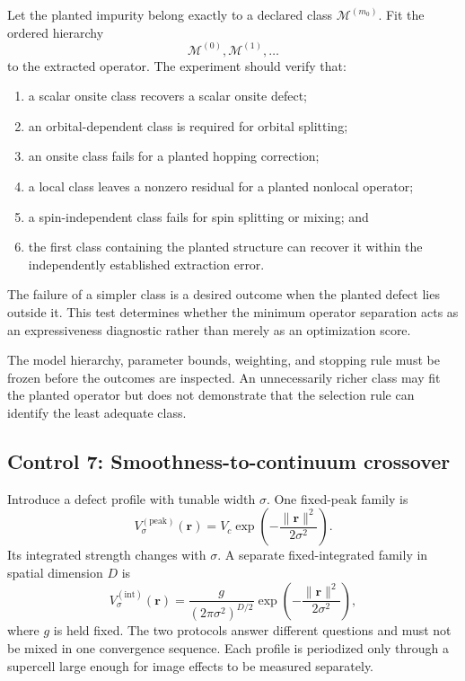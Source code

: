 Let the planted impurity belong exactly to a declared class
$\mathcal M^{(m_0)}$. Fit the ordered hierarchy
\begin{equation}
    \mathcal M^{(0)},
    \mathcal M^{(1)},
    \ldots
\end{equation}
to the extracted operator. The experiment should verify that:
\begin{enumerate}
    \item a scalar onsite class recovers a scalar onsite defect;
    \item an orbital-dependent class is required for orbital splitting;
    \item an onsite class fails for a planted hopping correction;
    \item a local class leaves a nonzero residual for a planted nonlocal
          operator;
    \item a spin-independent class fails for spin splitting or mixing; and
    \item the first class containing the planted structure can recover it
          within the independently established extraction error.
\end{enumerate}
The failure of a simpler class is a desired outcome when the planted defect lies
outside it. This test determines whether the minimum operator separation acts
as an expressiveness diagnostic rather than merely as an optimization score.

The model hierarchy, parameter bounds, weighting, and stopping rule must be
frozen before the outcomes are inspected. An unnecessarily richer class may
fit the planted operator but does not demonstrate that the selection rule can
identify the least adequate class.

\subsection*{Control 7: Smoothness-to-continuum crossover}

Introduce a defect profile with tunable width $\sigma$. One fixed-peak family
is
\begin{equation}
    V_{\sigma}^{(\mathrm{peak})}(\mathbf r)
    =
    V_c
    \exp\left(
        -\frac{\lVert\mathbf r\rVert^2}{2\sigma^2}
    \right).
\end{equation}
Its integrated strength changes with $\sigma$. A separate fixed-integrated
family in spatial dimension $D$ is
\begin{equation}
    V_{\sigma}^{(\mathrm{int})}(\mathbf r)
    =
    \frac{g}{(2\pi\sigma^2)^{D/2}}
    \exp\left(
        -\frac{\lVert\mathbf r\rVert^2}{2\sigma^2}
    \right),
\end{equation}
where $g$ is held fixed. The two protocols answer different questions and must
not be mixed in one convergence sequence. Each profile is periodized only
through a supercell large enough for image effects to be measured separately.

